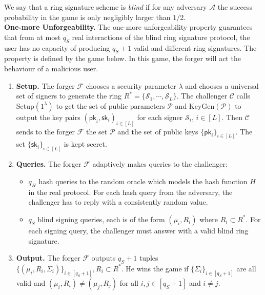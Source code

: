 \documentclass[runningheads]{llncs}
\begin{document}
We say that a ring signature scheme is \textit{blind} if for any adversary $\mathcal{A}$ the success probability in the game is only negligibly larger than $1/2$. \\

\noindent \textbf{One-more Unforgeability.}
The one-more unforgeability property guarantees that from at most $q_S$ real interactions of the blind ring signature protocol, the user has no capacity of producing $q_S+1$ valid and different ring signatures. The property is defined by the game below. In this game, the forger will act the behaviour of a malicious user.
\begin{enumerate}
	\item \textbf{Setup.} The forger $\mathcal{F}$ chooses a security parameter $\lambda$ and chooses a universal set of signers to generate the ring $R^{*}=\{\mathcal{S}_1, \cdots, \mathcal{S}_L \}$. The challenger $\mathcal{C}$ calls \textsf{Setup}$(1^{\lambda})$ to get the set of public parameters $\mathcal{P}$ and  \textsf{KeyGen}$(\mathcal{P})$ to output the key pairs $(\mathsf{pk}_i, \mathsf{sk}_i)_{i\in [L]}$ for each signer $\mathcal{S}_i$, $i \in [L]$. Then $\mathcal{C}$ sends to the forger $\mathcal{F}$ the set $\mathcal{P}$ and the set of public keys $\{\mathsf{pk}_i\}_{i\in [L]}$. The set $\{\mathsf{sk}_i\}_{i\in [L]}$ is kept secret.
	\item \textbf{Queries.} The forger $\mathcal{F}$ adaptively makes queries to the challenger:
	\begin{itemize}
		\item $q_H$ hash queries to the random oracle which models the hash function $H$ in the real protocol. For each hash query from the adversary, the challenger has to reply with a consistently random value. 
		\item $q_S$ blind signing queries,  each is of the form $(\mu_i, R_i)$ where $R_i\subset R^{*}$. For each signing query, the challenger must answer with a valid blind ring signature. 
	\end{itemize}
	
	\item \textbf{Output.} The forger $\mathcal{F}$ outputs $q_S+1$ tuples $\{ (\mu_i, R_i, \Sigma_i) \}_{i \in [q_S+1]}, R_i \subset R^*$. He wins the game if  $\{\Sigma_i\}_{i \in [q_S+1]}$ are all valid and $(\mu_i, R_i) \neq (\mu_j, R_j) $ for all $i, j \in [q_S+1]$ and $i \neq j$.
	
\end{enumerate}
\end{document}
